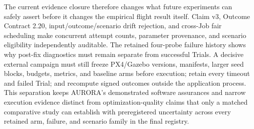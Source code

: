 The current evidence closure therefore changes what future experiments can safely
assert before it changes the empirical flight result itself. Claim v3,
Outcome Contract 2.20, input/outcome/scenario drift rejection, and
cross-Job fair scheduling make concurrent attempt counts, parameter
provenance, and scenario eligibility independently auditable. The
retained four-probe failure history shows why post-fix diagnostics must
remain separate from successful Trials. A decisive external campaign must
still freeze PX4/Gazebo versions, manifests, larger seed blocks, budgets,
metrics, and baseline arms before execution; retain every timeout and
failed Trial; and recompute signed outcomes outside the application
process. This separation keeps AURORA's demonstrated software assurances
and narrow execution evidence distinct from optimization-quality claims
that only a matched comparative study can establish with preregistered
uncertainty across every retained arm, failure, and scenario family in
the final registry.

